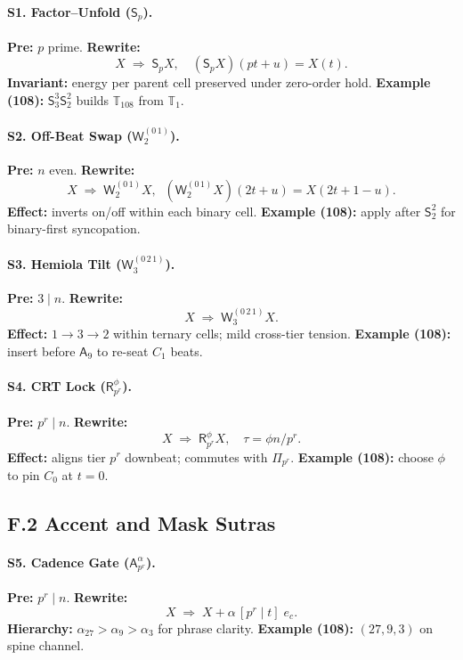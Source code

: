 \documentclass[12pt]{article}
\numberwithin{equation}{section}
\theoremstyle{plain}
\theoremstyle{definition}
\theoremstyle{remark}
\begin{document}
\paragraph{S1. Factor–Unfold ($\mathsf{S}_p$).}
\textbf{Pre:} $p$ prime. 
\textbf{Rewrite:}
\[
X \;\Rightarrow\; \mathsf{S}_p X,\quad (\mathsf{S}_p X)(pt+u)=X(t).
\]
\textbf{Invariant:} energy per parent cell preserved under zero-order hold.
\textbf{Example (108):} $\mathsf{S}_3^3\mathsf{S}_2^2$ builds $\mathbb{T}_{108}$ from $\mathbb{T}_1$.

\paragraph{S2. Off-Beat Swap ($\mathsf{W}_2^{(0\,1)}$).}
\textbf{Pre:} $n$ even. 
\textbf{Rewrite:}
\[
X \;\Rightarrow\; \mathsf{W}_2^{(0\,1)}X,\;\; (\mathsf{W}_2^{(0\,1)}X)(2t+u)=X(2t+1-u).
\]
\textbf{Effect:} inverts on/off within each binary cell.
\textbf{Example (108):} apply after $\mathsf{S}_2^2$ for binary-first syncopation.

\paragraph{S3. Hemiola Tilt ($\mathsf{W}_3^{(0\,2\,1)}$).}
\textbf{Pre:} $3\mid n$. 
\textbf{Rewrite:}
\[
X \;\Rightarrow\; \mathsf{W}_3^{(0\,2\,1)}X.
\]
\textbf{Effect:} $1\!\to\!3\!\to\!2$ within ternary cells; mild cross-tier tension.
\textbf{Example (108):} insert before $\mathsf{A}_9$ to re-seat $C_1$ beats.

\paragraph{S4. CRT Lock ($\mathsf{R}_{p^r}^{\phi}$).}
\textbf{Pre:} $p^r\mid n$. 
\textbf{Rewrite:}
\[
X \;\Rightarrow\; \mathsf{R}_{p^r}^{\phi}X,\quad \tau=\phi n/p^r.
\]
\textbf{Effect:} aligns tier $p^r$ downbeat; commutes with $\Pi_{p^r}$.
\textbf{Example (108):} choose $\phi$ to pin $C_0$ at $t=0$.

\subsection*{F.2 Accent and Mask Sutras}
\paragraph{S5. Cadence Gate ($\mathsf{A}_{p^r}^{\alpha}$).}
\textbf{Pre:} $p^r\mid n$. 
\textbf{Rewrite:}
\[
X \;\Rightarrow\; X+\alpha\,[p^r\mid t]\;e_c.
\]
\textbf{Hierarchy:} $\alpha_{27}>\alpha_9>\alpha_3$ for phrase clarity.
\textbf{Example (108):} $(27,9,3)$ on spine channel.
\end{document}
